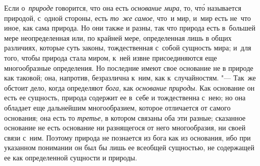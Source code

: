 Если о~{\em природе} говорится, что она есть {\em основание мира}, то, чт\'{о}
называется природой, с~одной стороны, есть {\em то~же самое}, что~и мир, и~мир
есть не~что иное, как сама природа. Но они также и разны, так что природа есть
в~большей мере неопределенная или, по крайней мере, определенная лишь в общих
различиях, которые суть законы, тождественная с~собой сущность мира; и~для
того, чтобы природа стала миром, к~ней извне присоединяются еще многообразные
определения. Но последние имеют свое основание не в природе как таковой; она,
напротив, безразлична к~ним, как к~случайностям. "--- Так~же обстоит дело,
когда определяют {\em бога}, как {\em основание природы}. Как основание он есть
ее сущность, природа содержит ее в~себе и тождественна с~нею; но она обладает
еще дальнейшим многообразием, которое отличается от самого основания; она есть
то {\em третье}, в котором связаны оба эти разные; сказанное основание не есть
основание ни разнящегося от него многообразия, ни своей связи с~ним. Поэтому
природа не познается из бога как из основания, ибо при указанном понимании он
был бы лишь ее всеобщей сущностью, не содержащей ее как определенной
сущности и природы.

